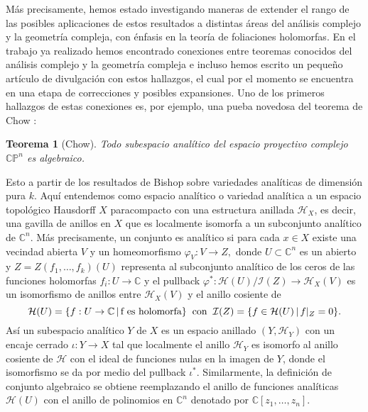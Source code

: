 \documentclass[letterpaper]{report}
\newtheorem{teorema}{Teorema}[chapter]
\newcommand{\co}{\ensuremath{\mathbb C }}
\newcommand{\con}{\ensuremath{\mathbb{C}^n}}
\newcommand{\cp}{\ensuremath{\mathbb{CP}}}
\begin{document}
M\'as precisamente, hemos estado investigando maneras de extender el rango de las posibles aplicaciones de estos resultados a
distintas \'areas del an\'alisis complejo y la geometr\'ia compleja, con \'enfasis en la teor\'ia de foliaciones holomorfas. En el trabajo
ya realizado hemos encontrado conexiones entre teoremas conocidos del an\'alisis complejo y la geometr\'ia compleja e incluso hemos
escrito un pequeño art\'iculo de divulgaci\'on con estos hallazgos, el cual por el momento se encuentra en una etapa de correcciones
y posibles expansiones. Uno de los primeros hallazgos de estas conexiones es, por ejemplo, una pueba novedosa del teorema de Chow \cite{Chow}:
\begin{teorema}[Chow]\label{Chow}
        Todo subespacio anal\'itico del espacio proyectivo complejo $\cp^{n}$ es algebraico.
\end{teorema}
\noindent Esto a partir de los resultados de Bishop sobre variedades anal\'iticas de dimensi\'on pura $k$. Aqu\'i entendemos como espacio 
anal\'itico o variedad anal\'itica a un espacio topol\'ogico Hausdorff $X$ paracompacto con una estructura anillada $\mathcal{H}_X$, es decir, una 
gavilla de anillos en $X$ que es localmente isomorfa a un subconjunto anal\'itico de $\con$. M\'as precisamente, un conjunto es anal\'itico 
si para cada $x\in X$ existe una vecindad abierta $V$ y un homeomorfismo $\varphi_V:V\rightarrow Z,$ donde $U\subset\con$ es un abierto y $Z=Z(f_1,\dots,f_k)(U)$ 
representa al subconjunto anal\'itico de los ceros de las funciones holomorfas $f_i:U\rightarrow\co$ y el pullback $\varphi^{*}:\mathcal{H}(U)/\mathcal{I}(Z)\rightarrow \mathcal{H}_X(V)$ 
es un isomorfismo de anillos entre $\mathcal{H}_X(V)$ y el anillo cosiente de
\[
        \mathcal{H}(U)=\{f:U\rightarrow\co\,|\,\text{f es holomorfa}\}\hspace{0.2cm}\text{con}\hspace{0.2cm}\mathcal{I}(Z)=\{f\in\mathcal{H}(U)\,|\,f|_{Z}=0\}.
\]
As\'i un subespacio anal\'itico $Y$ de $X$ es un espacio anillado $(Y,\mathcal{H}_Y)$ con un encaje cerrado $\iota:Y\rightarrow X$ tal que localmente el anillo
$\mathcal{H}_Y$ es isomorfo al anillo cosiente de $\mathcal{H}$ con el ideal de funciones nulas en la imagen de $Y$, donde el isomorfismo se da por medio del 
pullback $\iota^{*}$. Similarmente, la definici\'on de conjunto algebraico se obtiene reemplazando el anillo de funciones anal\'iticas $\mathcal{H}(U)$ con el anillo de 
polinomios en $\con$ denotado por $\co[z_1,\dots,z_n]$.
\end{document}

